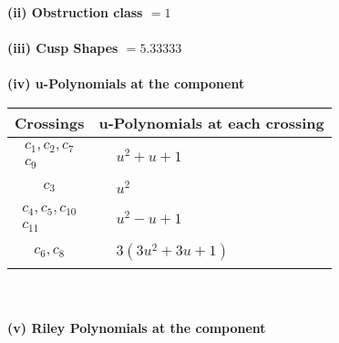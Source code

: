 \documentclass[1p]{elsarticle_modified}
\theoremstyle{definition}
\begin{document}
\flushleft \textbf{(ii) Obstruction class $= 1$}\\~\\
\flushleft \textbf{(iii) Cusp Shapes $= 5.33333$}\\~\\
\newpage\renewcommand{\arraystretch}{1}
\flushleft \textbf{(iv) u-Polynomials at the component}\newline \\
\begin{tabular}{m{50pt}|m{274pt}}
Crossings & \hspace{64pt}u-Polynomials at each crossing \\
\hline $$\begin{aligned}c_{1},c_{2},c_{7}\\c_{9}\end{aligned}$$&$\begin{aligned}
&u^2+u+1
\end{aligned}$\\
\hline $$\begin{aligned}c_{3}\end{aligned}$$&$\begin{aligned}
&u^2
\end{aligned}$\\
\hline $$\begin{aligned}c_{4},c_{5},c_{10}\\c_{11}\end{aligned}$$&$\begin{aligned}
&u^2- u+1
\end{aligned}$\\
\hline $$\begin{aligned}c_{6},c_{8}\end{aligned}$$&$\begin{aligned}
&3(3 u^2+3 u+1)
\end{aligned}$\\
\hline
\end{tabular}\\~\\
\newpage\renewcommand{\arraystretch}{1}
\flushleft \textbf{(v) Riley Polynomials at the component}\newline \\
\end{document}
